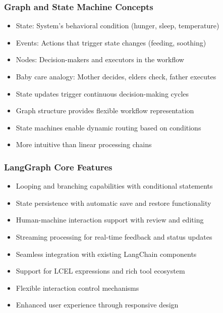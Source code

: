 \begin{frame}[fragile]\frametitle{Graph and State Machine Concepts}
      \begin{itemize}
        \item State: System's behavioral condition (hunger, sleep, temperature)
        \item Events: Actions that trigger state changes (feeding, soothing)
        \item Nodes: Decision-makers and executors in the workflow
        \item Baby care analogy: Mother decides, elders check, father executes
        \item State updates trigger continuous decision-making cycles
        \item Graph structure provides flexible workflow representation
        \item State machines enable dynamic routing based on conditions
        \item More intuitive than linear processing chains
      \end{itemize}
\end{frame}

\begin{frame}[fragile]\frametitle{LangGraph Core Features}
      \begin{itemize}
        \item Looping and branching capabilities with conditional statements
        \item State persistence with automatic save and restore functionality
        \item Human-machine interaction support with review and editing
        \item Streaming processing for real-time feedback and status updates
        \item Seamless integration with existing LangChain components
        \item Support for LCEL expressions and rich tool ecosystem
        \item Flexible interaction control mechanisms
        \item Enhanced user experience through responsive design
      \end{itemize}
\end{frame}

